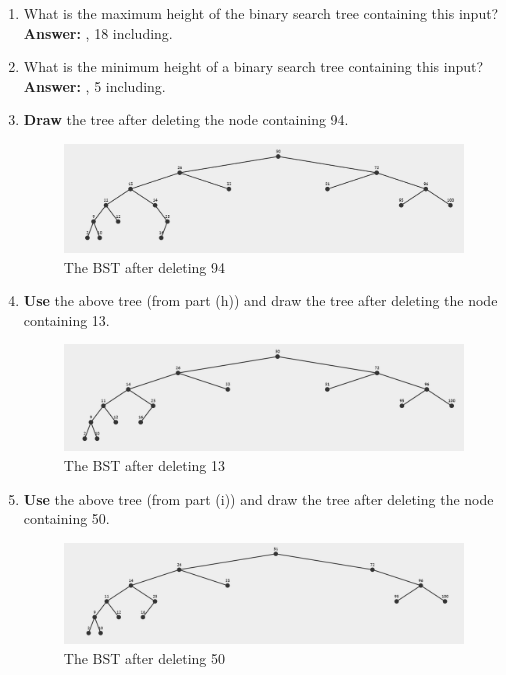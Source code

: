 \documentclass[12pt, a4paper]{article}
\newcommand{\squeezeup}{\vspace{-16pt}}%
\begin{document}
\begin{enumerate}
\begin{enumerate}
        \item What is the maximum height of the binary search tree containing this input? \\
        \hspace*{\fill} \textbf{Answer:} , 18 including.

        \item What is the minimum height of a binary search tree containing this input? \\
        \hspace*{\fill} \textbf{Answer:} , 5 including.

        \item \textbf{Draw} the tree after deleting the node containing 94.
        \begin{figure}[H]
            \includegraphics[max width=\textwidth/2, center]{"6(h).png"}
            \caption{The BST after deleting 94}
            \label{fig:6(h)-BST}
        \end{figure}\squeezeup

        \newpage

        \item \textbf{Use} the above tree (from part (h)) and draw the tree after deleting the node containing 13.
        \begin{figure}[H]
            \includegraphics[max width=\textwidth/2, center]{"6(i).png"}
            \caption{The BST after deleting 13}
            \label{fig:6(i)-BST}
        \end{figure}\squeezeup

        \item \textbf{Use} the above tree (from part (i)) and draw the tree after deleting the node containing 50.
        \begin{figure}[H]
            \includegraphics[max width=\textwidth/2, center]{"6(j).png"}
            \caption{The BST after deleting 50}
            \label{fig:6(j)-BST}
        \end{figure}\squeezeup


\end{enumerate}
\end{enumerate}
\end{document}
